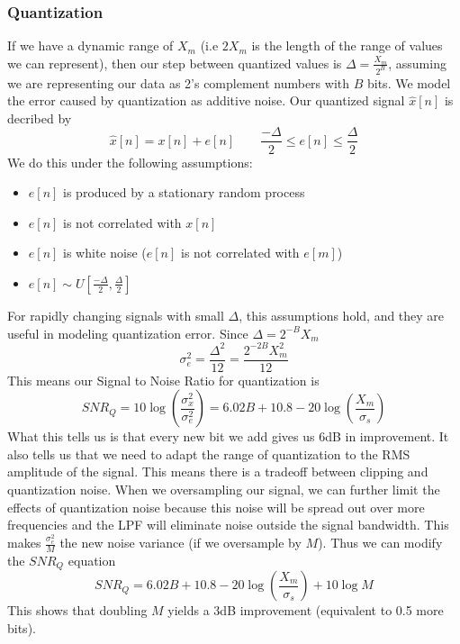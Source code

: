 \documentclass{article}
\begin{document}
\subsubsection{Quantization}
If we have a dynamic range of $X_m$ (i.e $2X_m$ is the length of the range of values we can represent), then
our step between quantized values is $\Delta=\frac{X_m}{2^B}$, assuming we are representing our data as 2's complement 
numbers with $B$ bits. We model the error caused by quantization as additive noise. Our quantized signal $\hat{x}[n]$ is decribed by
$$\hat{x}[n] = x[n] + e[n] \qquad \frac{-\Delta}{2}\le e[n] \le \frac{\Delta}{2}$$
We do this under the following assumptions:
\begin{itemize}
  \item $e[n]$ is produced by a stationary random process
  \item $e[n]$ is not correlated with $x[n]$
  \item $e[n]$ is white noise ($e[n]$ is not correlated with $e[m]$)
  \item $e[n]\sim U\left[\frac{-\Delta}{2},\frac{\Delta}{2}\right]$ 
\end{itemize}
For rapidly changing signals with small $\Delta$, this assumptions hold, and they are useful in modeling quantization error.
Since $\Delta = 2^{-B}X_m$
$$\sigma^2_e=\frac{\Delta^2}{12}=\frac{2^{-2B}X_m^2}{12}$$
This means our Signal to Noise Ratio for quantization is
$$SNR_Q=10\log\left(\frac{\sigma_x^2}{\sigma_e^2}\right)=6.02B+10.8-20\log\left(\frac{X_m}{\sigma_s}\right)$$
What this tells us is that every new bit we add gives us 6dB in improvement. It also tells us that we need to
adapt the range of quantization to the RMS amplitude of the signal. This means there is a tradeoff between clipping and quantization noise.
When we oversampling our signal, we can further limit the effects of quantization noise because this noise will be spread out over more frequencies
and the LPF will eliminate noise outside the signal bandwidth. This makes $\frac{\sigma_e^2}{M}$ the new noise variance (if we oversample by $M$).
Thus we can modify the $SNR_Q$ equation
$$SNR_Q=6.02B+10.8-20\log\left(\frac{X_m}{\sigma_s}\right) + 10\log M$$
This shows that doubling $M$ yields a 3dB improvement (equivalent to 0.5 more bits).
\end{document}
